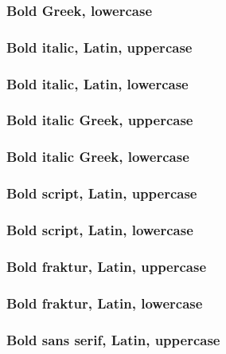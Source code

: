 \documentclass[a4paper,final]{article}
\begin{document}
\subsubsection{Bold Greek, lowercase}

\subsubsection{Bold italic, Latin, uppercase}

\subsubsection{Bold italic, Latin, lowercase}

\subsubsection{Bold italic Greek, uppercase}

\subsubsection{Bold italic Greek, lowercase}

\subsubsection{Bold script, Latin, uppercase}

\subsubsection{Bold script, Latin, lowercase}

\subsubsection{Bold fraktur, Latin, uppercase}

\subsubsection{Bold fraktur, Latin, lowercase}

\subsubsection{Bold sans serif, Latin, uppercase}
\end{document}
